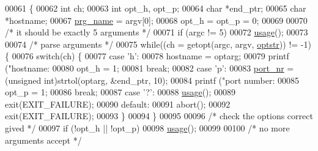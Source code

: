 \begin{DoxyCode}
{{00061 \{
00062         \textcolor{keywordtype}{int}             ch;
00063         \textcolor{keywordtype}{int}             opt\_h, opt\_p;
00064         \textcolor{keywordtype}{char}            *end\_ptr;
00065         \textcolor{keywordtype}{char}            *hostname;      
00067         \hyperlink{main_8c_a8a8a6db7728221fbc910782969be77c2}{prg\_name} = argv[0];
00068         opt\_h = opt\_p = 0;
00069 
00070         \textcolor{comment}{/* it should be exactly 5 arguments */}
00071         \textcolor{keywordflow}{if} (argc != 5)
00072                 \hyperlink{main_8c_ae8605e2b78cd4a81b6c6b5c30cb7366a}{usage}();
00073 
00074         \textcolor{comment}{/* parse arguments */}
00075         \textcolor{keywordflow}{while}((ch = getopt(argc, argv, \hyperlink{main_8c_adc0221a311d122f5c20b9ce7982f95ee}{optstr})) != -1) \{
00076                 \textcolor{keywordflow}{switch}(ch) \{
00077                         \textcolor{keywordflow}{case} \textcolor{charliteral}{'h'}:
00078                                 hostname = optarg;
00079                                 printf (\textcolor{stringliteral}{"hostname: %
00080                                 opt\_h = 1;
00081                                 \textcolor{keywordflow}{break};
00082                         \textcolor{keywordflow}{case} \textcolor{charliteral}{'p'}:
00083                                 \hyperlink{udp_8h_a54fac18369fc17e05c94bf0ab06ef7ac}{port\_nr} = (\textcolor{keywordtype}{unsigned} int)strtol(optarg, &end\_ptr, 10);
00084                                 printf (\textcolor{stringliteral}{"port number: %
00085                                 opt\_p = 1;
00086                                 \textcolor{keywordflow}{break};
00087                         \textcolor{keywordflow}{case} \textcolor{charliteral}{'?'}:
00088                                 \hyperlink{main_8c_ae8605e2b78cd4a81b6c6b5c30cb7366a}{usage}();
00089                                 exit(EXIT\_FAILURE);
00090                         \textcolor{keywordflow}{default}:
00091                                 abort();
00092                                 exit(EXIT\_FAILURE);
00093                 \}
00094         \}
00095         
00096         \textcolor{comment}{/* check the options correct gived */}
00097         \textcolor{keywordflow}{if} (!opt\_h || !opt\_p)
00098                 \hyperlink{main_8c_ae8605e2b78cd4a81b6c6b5c30cb7366a}{usage}();
00099 
00100         \textcolor{comment}{/* no more arguments accept */}
}}}}
\end{DoxyCode}
